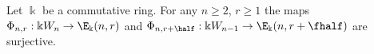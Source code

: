 \begin{theo}\label{thm:main1}
 Let $\Bbbk$ be a commutative ring. For any $n \ge 2$, $r \ge
 1$ the maps $\Phi_{n,r}: \Bbbk W_n \to \E_\Bbbk(n,r)$ and
 $\Phi_{n,r+\half}: \Bbbk W_{n-1} \to \E_\Bbbk(n,r+\fhalf)$ are
 surjective.
\end{theo}

